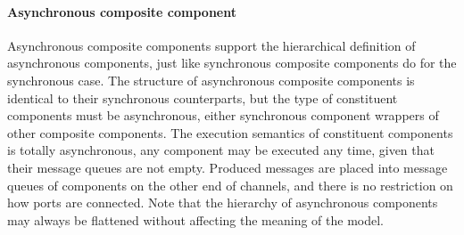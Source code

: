 \paragraph{Asynchronous composite component}
Asynchronous composite components support the hierarchical definition of asynchronous components, just like synchronous composite components do for the synchronous case. The structure of asynchronous composite components is identical to their synchronous counterparts, but the type of constituent components must be asynchronous, \ie either synchronous component wrappers of other composite components. The execution semantics of constituent components is totally asynchronous, any component may be executed any time, given that their message queues are not empty. Produced messages are placed into message queues of components on the other end of channels, and there is no restriction on how ports are connected.
Note that the hierarchy of asynchronous components may always be flattened without affecting the meaning of the model.




